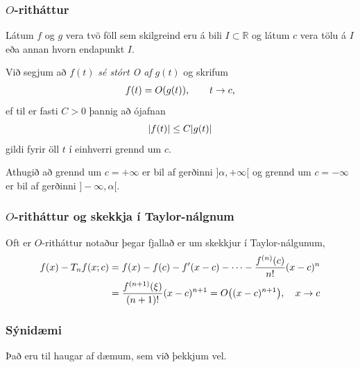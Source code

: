 \documentclass[a4paper,10pt,icelandic]{sphinxmanual}
\begin{document}

\subsubsection{\(O\)-ritháttur}
\label{kafli01:rithattur}\label{kafli01:index-13}
Látum \(f\) og \(g\) vera tvö föll sem skilgreind eru á bili
\(I \subset
\mathbb{R}\) og látum \(c\) vera tölu á \(I\) eða annan hvorn
endapunkt \(I\).

Við segjum að \(f(t)\) \emph{sé stórt O af} \(g(t)\) og skrifum
\begin{gather}
\begin{split}f(t) = O(g(t)), \qquad t \rightarrow c,\end{split}\notag
\end{gather}
ef til er fasti \(C>0\) þannig að ójafnan
\begin{gather}
\begin{split}|f(t)| \leq C|g(t)|\end{split}\notag
\end{gather}
gildi fyrir öll \(t\) í einhverri grennd um \(c\).

Athugið að grennd um \(c=+\infty\) er bil af gerðinni
\(]\alpha,+\infty[\) og grennd um \(c=-\infty\) er bil af
gerðinni \(]-\infty,\alpha[\).


\subsubsection{\(O\)-ritháttur og skekkja í Taylor-nálgnum}
\label{kafli01:rithattur-og-skekkja-i-taylor-nalgnum}
Oft er \(O\)-ritháttur notaður þegar fjallað er um skekkjur í
Taylor-nálgunum,
\begin{gather}
\begin{split}\begin{aligned}
    f(x) - T_n f(x;c) &= f(x) - f(c) - f'(x-c) - \cdots
    - \frac{f^{(n)}(c)}{n!}(x-c)^n \\
    &= \frac{f^{(n+1)}(\xi)}{(n+1)!}(x-c)^{n+1} =
    O\big((x-c)^{n+1}\big),  \quad x \to c\end{aligned}\end{split}\notag
\end{gather}

\subsubsection{Sýnidæmi}
\label{kafli01:id3}
Það eru til haugar af dæmum, sem við þekkjum vel.
\end{document}
